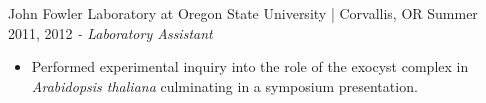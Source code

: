  John Fowler Laboratory at Oregon State University | Corvallis, OR \hfill Summer 2011, 2012 \newline
\textit{- Laboratory Assistant} \\
 \vspace{-4.5mm}
 \begin{itemize}
 \item Performed experimental inquiry into the role of the exocyst complex in \textit{Arabidopsis thaliana} culminating in a symposium presentation.
 \end{itemize}
  \vspace{-3.5mm}
